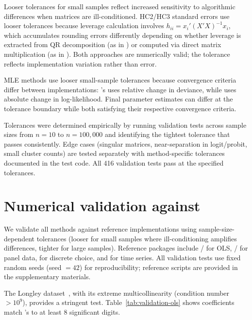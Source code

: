 Looser tolerances for small samples reflect
increased sensitivity to algorithmic differences when matrices are
ill-conditioned. HC2/HC3 standard errors use looser tolerances because
leverage calculation involves $h_{ii} = x_i'(X'X)^{-1}x_i$, which accumulates
rounding errors differently depending on whether leverage is extracted from
QR decomposition (as in ) or computed via direct matrix
multiplication (as in ). Both approaches are numerically
valid; the tolerance reflects implementation variation rather than error.

MLE methods use looser small-sample tolerances because convergence criteria
differ between implementations: 's  uses relative
change in deviance, while  uses absolute change in
log-likelihood. Final parameter estimates can differ at the tolerance boundary
while both satisfying their respective convergence criteria.

Tolerances were determined empirically by
running validation tests across sample sizes from $n = 10$ to $n = 100{,}000$
and identifying the tightest tolerance that passes consistently. Edge cases
(singular matrices, near-separation in logit/probit, small cluster counts)
are tested separately with method-specific tolerances documented in the
test code. All 416 validation tests pass at the specified tolerances.



\section[Numerical validation against R]{Numerical validation against } \label{app:numerical-validation}
\setcounter{table}{0}
\setcounter{figure}{0}

We validate all methods against reference  implementations using
sample-size-dependent tolerances (looser for small samples where
ill-conditioning amplifies differences, tighter for large samples).
Reference packages include / for OLS,
/ for panel data,  for discrete choice,
and  for time series. All validation tests use fixed
random seeds (seed $= 42$) for reproducibility; reference 
scripts are provided in the supplementary materials.

The Longley dataset~\citep{Longley:1967}, with its extreme
multicollinearity (condition number $> 10^9$), provides a stringent
test. Table~\ref{tab:validation-ols} shows coefficients match
's  to at least 8 significant digits.


